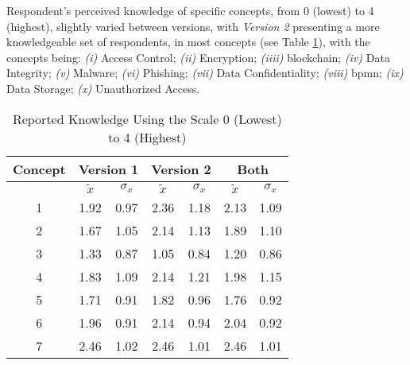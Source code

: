 Respondent's perceived knowledge of specific concepts, from 0 (lowest) to 4 (highest), slightly varied between versions, with \textit{Version 2} presenting a more knowledgeable set of respondents, in most concepts (see Table \ref{tab: knowledge}), with the concepts being: \emph{(i)} Access Control; \emph{(ii)} Encryption; \emph{(iiii)} blockchain; \emph{(iv)} Data Integrity; \emph{(v)} Malware; \emph{(vi)} Phishing; \emph{(vii)} Data Confidentiality; \emph{(viii)} \gls{bpmn}; \emph{(ix)} Data Storage; \emph{(x)} Unauthorized Access.

\begin{table}[htb]
	\centering
	\caption{Reported Knowledge Using the Scale 0 (Lowest) to 4 (Highest)}
	\label{tab: knowledge}
	\begin{tabular}{c|cc|cc|cc}
		\hline
		\bf Concept & \multicolumn{2}{c}{\bf Version 1} \vrule & \multicolumn{2}{c}{\bf Version 2} \vrule & \multicolumn{2}{c}{\bf Both}                                             \\
		\hline
		            & $\tilde{x}$                       & $\sigma_{x}$                             & $\tilde{x}$                  & $\sigma_{x}$ & $\tilde{x}$ & $\sigma_{x}$ \\
		\hline
		1           & 1.92                              & 0.97                                     & 2.36                         & 1.18         & 2.13        & 1.09         \\
		\hline
		2           & 1.67                              & 1.05                                     & 2.14                         & 1.13         & 1.89        & 1.10         \\
		\hline
		3           & 1.33                              & 0.87                                     & 1.05                         & 0.84         & 1.20        & 0.86         \\
		\hline
		4           & 1.83                              & 1.09                                     & 2.14                         & 1.21         & 1.98        & 1.15         \\
		\hline
		5           & 1.71                              & 0.91                                     & 1.82                         & 0.96         & 1.76        & 0.92         \\
		\hline
		6           & 1.96                              & 0.91                                     & 2.14                         & 0.94         & 2.04        & 0.92         \\
		\hline
		7           & 2.46                              & 1.02                                     & 2.46                         & 1.01         & 2.46        & 1.01         \\

\end{tabular}
\end{table}
